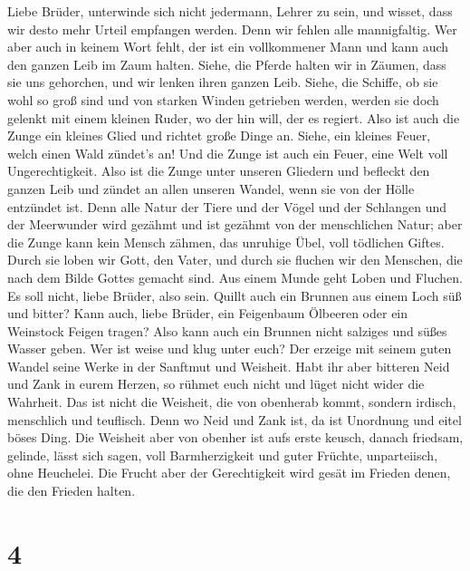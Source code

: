  Liebe Brüder, unterwinde sich nicht jedermann, Lehrer zu
sein, und wisset, dass wir desto mehr Urteil empfangen werden.
 Denn wir fehlen alle mannigfaltig. Wer aber auch in
keinem Wort fehlt, der ist ein vollkommener Mann und kann auch den
ganzen Leib im Zaum halten.  Siehe, die Pferde halten wir
in Zäumen, dass sie uns gehorchen, und wir lenken ihren ganzen Leib.
 Siehe, die Schiffe, ob sie wohl so groß sind und von
starken Winden getrieben werden, werden sie doch gelenkt mit einem
kleinen Ruder, wo der hin will, der es regiert.  Also ist
auch die Zunge ein kleines Glied und richtet große Dinge an. Siehe, ein
kleines Feuer, welch einen Wald zündet's an!  Und die
Zunge ist auch ein Feuer, eine Welt voll Ungerechtigkeit. Also ist die
Zunge unter unseren Gliedern und befleckt den ganzen Leib und zündet an
allen unseren Wandel, wenn sie von der Hölle entzündet ist.
 Denn alle Natur der Tiere und der Vögel und der Schlangen
und der Meerwunder wird gezähmt und ist gezähmt von der menschlichen
Natur;  aber die Zunge kann kein Mensch zähmen, das
unruhige Übel, voll tödlichen Giftes.  Durch sie loben wir
Gott, den Vater, und durch sie fluchen wir den Menschen, die nach dem
Bilde Gottes gemacht sind.  Aus einem Munde geht Loben
und Fluchen. Es soll nicht, liebe Brüder, also sein. 
Quillt auch ein Brunnen aus einem Loch süß und bitter? 
Kann auch, liebe Brüder, ein Feigenbaum Ölbeeren oder ein Weinstock
Feigen tragen? Also kann auch ein Brunnen nicht salziges und süßes
Wasser geben.  Wer ist weise und klug unter euch? Der
erzeige mit seinem guten Wandel seine Werke in der Sanftmut und
Weisheit.  Habt ihr aber bitteren Neid und Zank in eurem
Herzen, so rühmet euch nicht und lüget nicht wider die Wahrheit.
 Das ist nicht die Weisheit, die von obenherab kommt,
sondern irdisch, menschlich und teuflisch.  Denn wo Neid
und Zank ist, da ist Unordnung und eitel böses Ding.  Die
Weisheit aber von obenher ist aufs erste keusch, danach friedsam,
gelinde, lässt sich sagen, voll Barmherzigkeit und guter Früchte,
unparteiisch, ohne Heuchelei.  Die Frucht aber der
Gerechtigkeit wird gesät im Frieden denen, die den Frieden halten.

\hypertarget{section-3}{%
\section{4}\label{section-3}}

